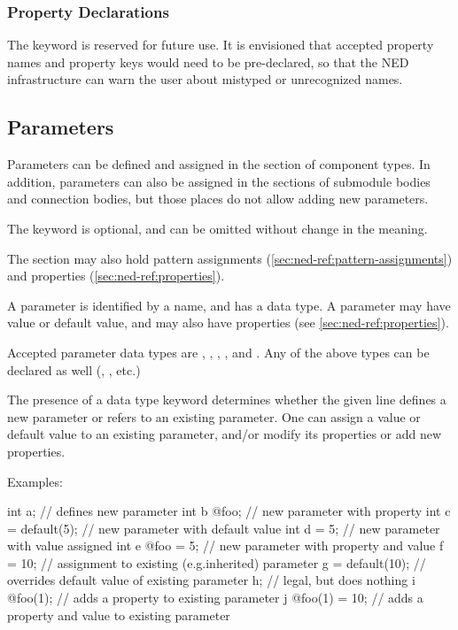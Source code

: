 \subsubsection{Property Declarations}
\label{sec:ned-ref:property-declarations}

The  keyword is reserved for future use. It is
envisioned that accepted property names and property keys would need
to be pre-declared, so that the NED infrastructure can warn the user
about mistyped or unrecognized names.


\subsection{Parameters}
\label{sec:ned-ref:parameters}

Parameters can be defined and assigned in the  section
of component types. In addition, parameters can also be assigned in the
 sections of submodule bodies and connection bodies,
but those places do not allow adding new parameters.

The  keyword is optional, and can be omitted
without change in the meaning.

The  section may also hold pattern assignments
(\ref{sec:ned-ref:pattern-assignments}) and properties
(\ref{sec:ned-ref:properties}).

A parameter is identified by a name, and has a data type. A parameter
may have value or default value, and may also have properties
(see \ref{sec:ned-ref:properties}).

Accepted parameter data types are , ,
, , and . Any
of the above types can be declared  as well
(, , etc.)

The presence of a data type keyword determines whether the given line defines
a new parameter or refers to an existing parameter. One can assign a value or
default value to an existing parameter, and/or modify its properties or add
new properties.

Examples:

\begin{ned}
int a;           // defines new parameter
int b @foo;      // new parameter with property
int c = default(5); // new parameter with default value
int d = 5;       // new parameter with value assigned
int e @foo = 5;  // new parameter with property and value
f = 10;          // assignment to existing (e.g.inherited) parameter
g = default(10); // overrides default value of existing parameter
h;               // legal, but does nothing
i @foo(1);       // adds a property to existing parameter
j @foo(1) = 10;  // adds a property and value to existing parameter
\end{ned}

